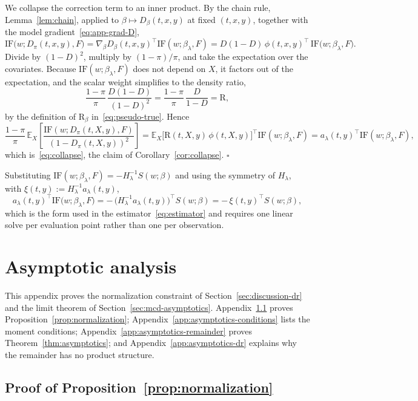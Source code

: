 \documentclass[11pt]{article}
\theoremstyle{plain}
\theoremstyle{definition}
\theoremstyle{remark}
\newcommand{\pE}{\ensuremath{\mathbb{E}}}
\newcommand{\ratio}{\ensuremath{\pi}}
\newcommand{\contrast}{D_{\ratio}}
\newcommand{\DensityRatio}{\text{R}}
\newcommand{\IF}{\mathrm{IF}}
\newcommand{\score}{S}
\begin{document}
We collapse the correction term to an inner product. By the chain rule, Lemma~\ref{lem:chain},
applied to $\beta \mapsto D_\beta(t,x,y)$ at fixed $(t,x,y)$, together with the model
gradient~\eqref{eq:app-grad-D},
\[
\IF\big(w;\contrast(t,x,y),F\big)
= \nabla_\beta D_\beta(t,x,y)^\top \IF(w;\beta_\lambda,F)
= D(1-D)\,\phi(t,x,y)^\top\,\IF\big(w;\beta_\lambda,F\big).
\]
Divide by $(1-D)^2$, multiply by $(1-\ratio)/\ratio$, and take the expectation over the
covariates. Because $\IF(w;\beta_\lambda,F)$ does not depend on $X$, it factors out of the
expectation, and the scalar weight simplifies to the density ratio,
\[
\frac{1-\ratio}{\ratio}\,\frac{D(1-D)}{(1-D)^2}
= \frac{1-\ratio}{\ratio}\,\frac{D}{1-D}
= \DensityRatio ,
\]
by the definition of $\DensityRatio_\beta$ in~\eqref{eq:pseudo-true}. Hence
\[
\frac{1-\ratio}{\ratio}\,
\pE_X\!\left[ \frac{\IF(w;\contrast(t,X,y),F)}{(1-\contrast(t,X,y))^2} \right]
= \pE_X\big[ \DensityRatio(t,X,y)\,\phi(t,X,y) \big]^\top \IF(w;\beta_\lambda,F)
= a_\lambda(t,y)^\top \IF(w;\beta_\lambda,F),
\]
which is~\eqref{eq:collapse}, the claim of Corollary~\ref{cor:collapse}. \hfill$\square$

Substituting $\IF(w;\beta_\lambda,F) = -H_\lambda^{-1}\score(w;\beta)$ and using the symmetry of
$H_\lambda$, with $\xi(t,y) := H_\lambda^{-1}a_\lambda(t,y)$,
\[
a_\lambda(t,y)^\top \IF\big(w;\beta_\lambda,F\big)
= -\,\big( H_\lambda^{-1}a_\lambda(t,y) \big)^\top \score(w;\beta)
= -\,\xi(t,y)^\top \score(w;\beta),
\]
which is the form used in the estimator~\eqref{eq:estimator} and requires one linear solve per
evaluation point rather than one per observation.

\section{Asymptotic analysis}
\label{app:asymptotics}

This appendix proves the normalization constraint of Section~\ref{sec:discussion-dr} and the
limit theorem of Section~\ref{sec:mcd-asymptotics}. Appendix~\ref{app:asymptotics-normalization}
proves Proposition~\ref{prop:normalization}; Appendix~\ref{app:asymptotics-conditions} lists the
moment conditions; Appendix~\ref{app:asymptotics-remainder} proves Theorem~\ref{thm:asymptotics};
and Appendix~\ref{app:asymptotics-dr} explains why the remainder has no product structure.

\subsection{Proof of Proposition~\ref{prop:normalization}}
\label{app:asymptotics-normalization}
\end{document}
